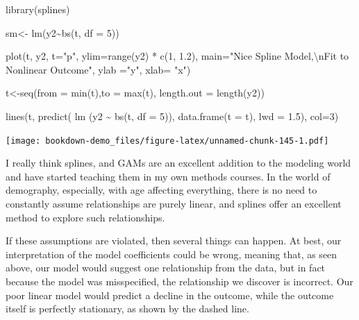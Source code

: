\documentclass[
]{article}
\newenvironment{Shaded}{\begin{snugshade}}{\end{snugshade}}
\newcommand{\AttributeTok}[1]{\textcolor[rgb]{0.77,0.63,0.00}{#1}}
\newcommand{\DecValTok}[1]{\textcolor[rgb]{0.00,0.00,0.81}{#1}}
\newcommand{\FloatTok}[1]{\textcolor[rgb]{0.00,0.00,0.81}{#1}}
\newcommand{\FunctionTok}[1]{\textcolor[rgb]{0.00,0.00,0.00}{#1}}
\newcommand{\NormalTok}[1]{#1}
\newcommand{\OtherTok}[1]{\textcolor[rgb]{0.56,0.35,0.01}{#1}}
\newcommand{\SpecialCharTok}[1]{\textcolor[rgb]{0.00,0.00,0.00}{#1}}
\newcommand{\StringTok}[1]{\textcolor[rgb]{0.31,0.60,0.02}{#1}}
\begin{document}
\begin{Shaded}
\begin{Highlighting}[]
\FunctionTok{library}\NormalTok{(splines)}

\NormalTok{sm}\OtherTok{\textless{}{-}} \FunctionTok{lm}\NormalTok{(y2}\SpecialCharTok{\textasciitilde{}}\FunctionTok{bs}\NormalTok{(t, }\AttributeTok{df =} \DecValTok{5}\NormalTok{))}

\FunctionTok{plot}\NormalTok{(t, y2, }\AttributeTok{t=}\StringTok{"p"}\NormalTok{,}
     \AttributeTok{ylim=}\FunctionTok{range}\NormalTok{(y2) }\SpecialCharTok{*} \FunctionTok{c}\NormalTok{(}\DecValTok{1}\NormalTok{, }\FloatTok{1.2}\NormalTok{),}
     \AttributeTok{main=}\StringTok{"Nice Spline Model,}\SpecialCharTok{\textbackslash{}n}\StringTok{Fit to Nonlinear Outcome"}\NormalTok{,}
     \AttributeTok{ylab =}\StringTok{"y"}\NormalTok{,}
     \AttributeTok{xlab=} \StringTok{"x"}\NormalTok{)}

\NormalTok{t}\OtherTok{\textless{}{-}}\FunctionTok{seq}\NormalTok{(}\AttributeTok{from =} \FunctionTok{min}\NormalTok{(t),}\AttributeTok{to =} \FunctionTok{max}\NormalTok{(t), }\AttributeTok{length.out =} \FunctionTok{length}\NormalTok{(y2))}

\FunctionTok{lines}\NormalTok{(t, }\FunctionTok{predict}\NormalTok{( }\FunctionTok{lm}\NormalTok{ (y2 }\SpecialCharTok{\textasciitilde{}} \FunctionTok{bs}\NormalTok{(t, }\AttributeTok{df =} \DecValTok{5}\NormalTok{)),}
                 \FunctionTok{data.frame}\NormalTok{(}\AttributeTok{t =}\NormalTok{ t), }\AttributeTok{lwd =} \FloatTok{1.5}\NormalTok{),}
      \AttributeTok{col=}\DecValTok{3}\NormalTok{)}
\end{Highlighting}
\end{Shaded}

\texttt{[image: bookdown-demo\_files/figure-latex/unnamed-chunk-145-1.pdf]}

I really think splines, and GAMs are an excellent addition to the modeling world and have started teaching them in my own methods courses. In the world of demography, especially, with age affecting everything, there is no need to constantly assume relationships are purely linear, and splines offer an excellent method to explore such relationships.

If these assumptions are violated, then several things can happen. At best, our interpretation of the model coefficients could be wrong, meaning that, as seen above, our model would suggest one relationship from the data, but in fact because the model was misspecified, the relationship we discover is incorrect. Our poor linear model would predict a decline in the outcome, while the outcome itself is perfectly stationary, as shown by the dashed line.
\end{document}
